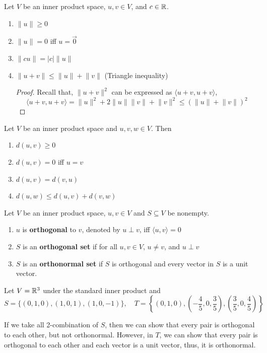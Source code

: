 \newpage
\begin{theorem}
Let $V$ be an inner product space, $u, v \in V$, and $c \in \mathbb{R}$.
\begin{enumerate}
    \item $\lVert u \rVert \geq 0$
    \item $\lVert u \rVert = 0$ iff $u = \vec{0}$
    \item $\lVert cu \rVert = \lvert c \rvert \lVert u \rVert$
    \item $\lVert u + v \rVert \leq \lVert u \rVert + \lVert v \rVert$ (Triangle inequality)
    \begin{proof}
    Recall that, $\lVert u + v \rVert^2$ can be expressed as $\langle u + v, u + v \rangle$,
    $$\langle u + v, u + v \rangle = \lVert u \rVert^2 + 2 \lVert u \rVert \lVert v \rVert + \lVert v \rVert^2 \leq (\lVert u \rVert + \lVert v \rVert)^2$$
    \end{proof} 
\end{enumerate}
\end{theorem}

\begin{remark}
Let $V$ be an inner product space and $u, v, w \in V$. Then
\begin{enumerate}
    \item $d(u, v) \geq 0$
    \item $d(u, v) = 0$ iff $u = v$
    \item $d(u, v) = d(v, u)$
    \item $d(u, w) \leq d(u, v) + d(v, w)$
\end{enumerate}
\end{remark}

\begin{definition}
Let $V$ be an inner product space, $u, v \in V$ and $S \subseteq V$ be nonempty. 
\begin{enumerate}
    \item $u$ is \textbf{orthogonal} to $v$, denoted by $u \perp v$, iff $\langle u, v \rangle = 0$
    \item $S$ is an \textbf{orthogonal set} if for all $u, v \in V$, $u \neq v$, and $u \perp v$
    \item $S$ is an \textbf{orthonormal set} if $S$ is orthogonal and every vector in $S$ is a unit vector.
\end{enumerate}
\end{definition}

\begin{example}
Let $V = \mathbb{R}^3$ under the standard inner product and 
$$S = \{(0, 1, 0), (1, 0, 1), (1, 0, -1)\}, \quad T = \left\{(0, 1, 0), \left(-\frac{4}{5}, 0, \frac{3}{5}\right), \left(\frac{3}{5}, 0, \frac{4}{5}\right)\right\}$$

If we take all 2-combination of $S$, then we can show that every pair is orthogonal to each other, but not orthonormal. However, in $T$, we can show that every pair is orthogonal to each other and each vector is a unit vector, thus, it is orthonormal.
\end{example}


